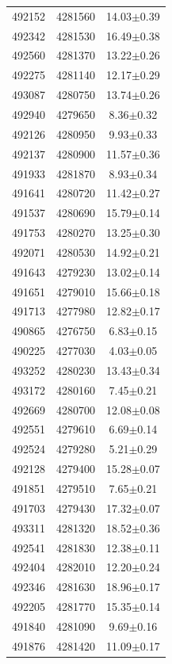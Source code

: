 \documentclass[12pt,letter]{article}
\begin{document}
\begin{center}
\begin{supertabular}{c c c}
492152	 & 	4281560	 & 	14.03$\pm$0.39\\ 
492342	 & 	4281530	 & 	16.49$\pm$0.38\\ 
492560	 & 	4281370	 & 	13.22$\pm$0.26\\ 
492275	 & 	4281140	 & 	12.17$\pm$0.29\\ 
493087	 & 	4280750	 & 	13.74$\pm$0.26\\ 
492940	 & 	4279650	 & 	8.36$\pm$0.32\\ 
492126	 & 	4280950	 & 	9.93$\pm$0.33\\ 
492137	 & 	4280900	 & 	11.57$\pm$0.36\\ 
491933	 & 	4281870	 & 	8.93$\pm$0.34\\ 
491641	 & 	4280720	 & 	11.42$\pm$0.27\\ 
491537	 & 	4280690	 & 	15.79$\pm$0.14\\ 
491753	 & 	4280270	 & 	13.25$\pm$0.30\\ 
492071	 & 	4280530	 & 	14.92$\pm$0.21\\ 
491643	 & 	4279230	 & 	13.02$\pm$0.14\\ 
491651	 & 	4279010	 & 	15.66$\pm$0.18\\ 
491713	 & 	4277980	 & 	12.82$\pm$0.17\\ 
490865	 & 	4276750	 & 	6.83$\pm$0.15\\ 
490225	 & 	4277030	 & 	4.03$\pm$0.05\\ 
493252	 & 	4280230	 & 	13.43$\pm$0.34\\ 
493172	 & 	4280160	 & 	7.45$\pm$0.21\\ 
492669	 & 	4280700	 & 	12.08$\pm$0.08\\ 
492551	 & 	4279610	 & 	6.69$\pm$0.14\\ 
492524	 & 	4279280	 & 	5.21$\pm$0.29\\ 
492128	 & 	4279400	 & 	15.28$\pm$0.07\\ 
491851	 & 	4279510	 & 	7.65$\pm$0.21\\ 
491703	 & 	4279430	 & 	17.32$\pm$0.07\\ 
493311	 & 	4281320	 & 	18.52$\pm$0.36\\ 
492541	 & 	4281830	 & 	12.38$\pm$0.11\\ 
492404	 & 	4282010	 & 	12.20$\pm$0.24\\ 
492346	 & 	4281630	 & 	18.96$\pm$0.17\\ 
492205	 & 	4281770	 & 	15.35$\pm$0.14\\ 
491840	 & 	4281090	 & 	9.69$\pm$0.16\\ 
491876	 & 	4281420	 & 	11.09$\pm$0.17\\ 

\end{supertabular}
\end{center}
\end{document}
